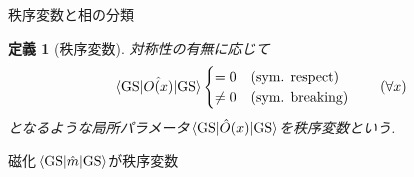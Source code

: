 \documentclass[dvipdfm]{beamer}
\newtheorem*{defn}{定義}
\newtheorem*{exmpl}{例}
\begin{document}


\begin{frame}{秩序変数と相の分類}
    \begin{defn}[秩序変数]
        対称性の有無に応じて
        \begin{equation*}
            \ev{\hat{O(x)}}{\mathrm{GS}}
            \begin{cases}
                =0 & (\text{sym. respect})
                \\
                \neq0 & (\text{sym. breaking})
            \end{cases}
            \qquad
            (\forall x)
        \end{equation*}
        となるような局所パラメータ$\ev{\hat{O}(x)}{\mathrm{GS}}$を秩序変数という. 
    \end{defn}
    \begin{example}
        磁化$\ev{\hat{m}}{\mathrm{GS}}$が秩序変数
    \end{example}
\end{frame}
\end{document}
